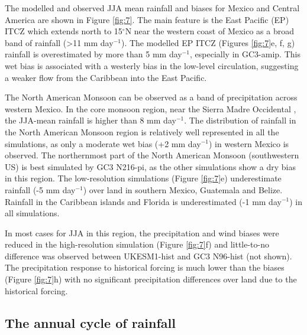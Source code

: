 The modelled and observed JJA mean rainfall and biases for Mexico and Central America are shown in Figure \ref{fig:7}.
The main feature is the East Pacific (EP) ITCZ which extends north to 15$^\circ$N near the western coast of Mexico as a broad band of rainfall (>11 mm day$^{-1}$).
 The modelled EP ITCZ (Figures \ref{fig:7}e, f, g) rainfall is overestimated by more than 5 mm day$^{-1}$, especially in GC3-amip. This wet bias is associated with a westerly bias in the low-level circulation, suggesting a weaker flow from the Caribbean into the East Pacific.

The North American Monsoon can be observed as a band of precipitation across western Mexico. In the core monsoon region, near the Sierra Madre Occidental \citep{adams1997, zhou2016}, the JJA-mean rainfall is higher than 8 mm day$^{-1}$. %
The distribution of rainfall in the North American Monsoon region is relatively well represented in all the simulations, as only a moderate wet bias (+2 mm day$^{-1}$) in western Mexico is observed.
The northernmost part of the North American Monsoon (southwestern US) is best simulated by GC3 N216-pi, as the other simulations show a dry bias in this region.
The low-resolution simulations (Figure \ref{fig:7}e) underestimate rainfall (-5 mm day$^{-1}$) over land in southern Mexico, Guatemala and Belize.
Rainfall in the Caribbean islands and Florida is underestimated (-1 mm day$^{-1}$) in all simulations.

In most cases for JJA in this region, the precipitation and wind biases were reduced in the high-resolution simulation (Figure \ref{fig:7}f) and little-to-no difference was observed between UKESM1-hist and GC3 N96-hist (not shown).
The precipitation response to historical forcing is much lower than the biases (Figure \ref{fig:7}h) with no significant precipitation differences over land due to the historical forcing. %
 

\subsection{The annual cycle of rainfall}\label{sq:raincycle}

